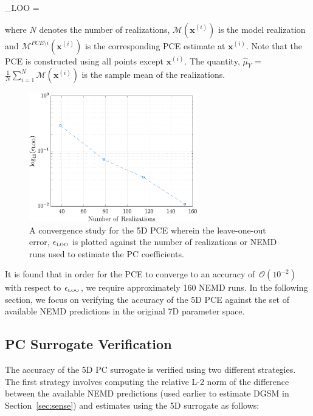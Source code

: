\be
\epsilon_{\tiny{\mbox{LOO}}} = 
\label{eq:loo}
\ee 

\noindent where $N$ denotes the number of realizations, $\mathcal{M}(\bm{x}^{(i)})$ is the
model realization and $\mathcal{M}^{PCE\setminus i}(\bm{x}^{(i)})$ is the corresponding PCE estimate
at $\bm{x}^{(i)}$. Note that the PCE is constructed using all points except $\bm{x}^{(i)}$.
The quantity, $\hat{\mu}_Y$ = $\frac{1}{N}\sum\limits_{i=1}^{N}\mathcal{M}(\bm{x}^{(i)})$
is the sample mean of the realizations.

\begin{figure}[htbp]
 \begin{center}
  \includegraphics[width=0.65\textwidth]{./Figures/PCE5D_eloo}
\caption{A convergence study for the 5D PCE wherein the leave-one-out
error, $\epsilon_{\tiny{\mbox{LOO}}}$ is plotted against the number of
realizations or NEMD runs used to estimate the PC coefficients.}
\label{fig:loo}
\end{center}
\end{figure}
 
It is found that in order for the PCE to converge to an accuracy of~$\mathcal{O}(10^{-2})$
with respect to $\epsilon_{\tiny{\mbox{LOO}}}$, we require approximately 160 NEMD runs. In the
following section, we focus on verifying the accuracy of the 5D PCE against the set of available
NEMD predictions in the original 7D parameter space. 

\subsection{PC Surrogate Verification}

The accuracy of the 5D PC surrogate is verified using two different strategies. The first strategy involves
computing the relative L-2 norm of the difference between the available NEMD predictions (used earlier
to estimate DGSM in Section~\ref{sec:sense}) and estimates using the 5D surrogate as follows:

